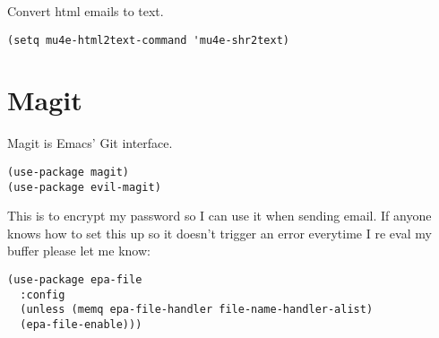 \documentclass{article}
\begin{document}
Convert html emails to text.

\begin{verbatim}
(setq mu4e-html2text-command 'mu4e-shr2text)
\end{verbatim}
\section{Magit}
\label{sec-14}

Magit is Emacs' Git interface.

\begin{verbatim}
(use-package magit)
(use-package evil-magit)
\end{verbatim}

This is to encrypt my password so I can use it when sending email. If anyone knows how to set this up so it doesn't trigger an error everytime I re eval my buffer please let me know:

\begin{verbatim}
(use-package epa-file
  :config
  (unless (memq epa-file-handler file-name-handler-alist)
  (epa-file-enable)))
\end{verbatim}
\end{document}
